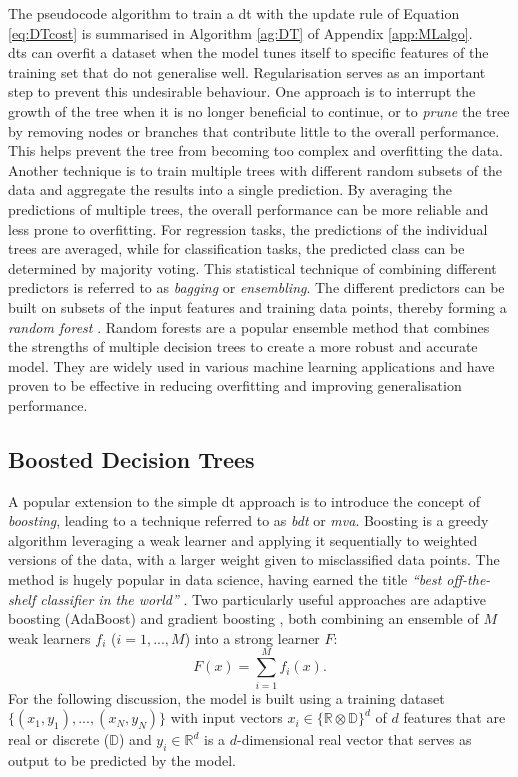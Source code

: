The pseudocode algorithm to train a \gls{dt} with the update rule of Equation \ref{eq:DTcost} is summarised in Algorithm \ref{ag:DT} of Appendix \ref{app:MLalgo}. \\

\glspl{dt} can overfit a dataset when the model tunes itself to specific features of the training set that do not generalise well. Regularisation serves as an important step to prevent this undesirable behaviour. One approach is to interrupt the growth of the tree when it is no longer beneficial to continue, or to \textit{prune} the tree by removing nodes or branches that contribute little to the overall performance. This helps prevent the tree from becoming too complex and overfitting the data. Another technique is to train multiple trees with different random subsets of the data and aggregate the results into a single prediction. By averaging the predictions of multiple trees, the overall performance can be more reliable and less prone to overfitting. For regression tasks, the predictions of the individual trees are averaged, while for classification tasks, the predicted class can be determined by majority voting. This statistical technique of combining different predictors is referred to as \textit{bagging} or \textit{ensembling}. The different predictors can be built on subsets of the input features and training data points, thereby forming a \textit{random forest} \cite{russel2010}. Random forests are a popular ensemble method that combines the strengths of multiple decision trees to create a more robust and accurate model. They are widely used in various machine learning applications and have proven to be effective in reducing overfitting and improving generalisation performance.

\subsection{Boosted Decision Trees}
A popular extension to the simple \gls{dt} approach is to introduce the concept of \textit{boosting}, leading to a technique referred to as \textit{\gls{bdt}} or \textit{\gls{mva}}. Boosting is a greedy algorithm leveraging a weak learner and applying it sequentially to weighted versions of the data, with a larger weight given to misclassified data points. The method is hugely popular in data science, having earned the title \textit{``best off-the-shelf classifier in the world''} \cite{baggingML}. Two particularly useful approaches are adaptive boosting (AdaBoost) \cite{Adaboost} and gradient boosting \cite{gradientBoosting}, both combining an ensemble of $M$ weak learners $f_i$ ($i = 1, ..., M$) into a strong learner $F$: \[F(x) = \sum_{i=1}^M f_i(x).\] For the following discussion, the model is built using a training dataset $ \{(x_1, y_1), ..., (x_N, y_N)\}$ with input vectors $x_i \in \{\mathbb{R} \otimes \mathbb{D}\}^d$ of $d$ features that are real or discrete ($\mathbb{D}$) and $y_i \in \mathbb{R}^d$ is a $d$-dimensional real vector that serves as output to be predicted by the model.


